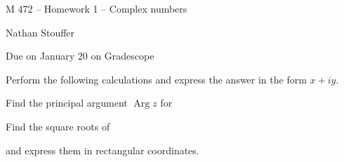 \documentclass[11pt]{exam}
\newcommand{\ds}{\displaystyle}
\DeclareMathOperator{\Arg}{Arg}
\begin{document}
\centerline{\Large M 472 -- Homework 1 -- Complex numbers}
\vspace{1ex}
\centerline{Nathan Stouffer}
\vspace{1ex}
\centerline{Due on January 20 on Gradescope}
\vspace{3ex}
\thispagestyle{empty}
\begin{questions}
\question Perform the following calculations and express the answer
in the form $x+iy$.

\question Find the principal argument $\Arg z$
for

\question Find the square roots of
and express them in rectangular coordinates.


\end{questions}
\end{document}
